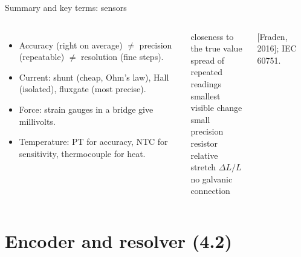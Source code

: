 \documentclass[aspectratio=169,10pt]{beamer}
\begin{document}
\begin{frame}{Summary and key terms: sensors}
\begin{columns}[T]
\begin{itemize}\small
\item Accuracy (right on average) $\neq$ precision (repeatable) $\neq$ resolution (fine steps).
\item Current: shunt (cheap, Ohm's law), Hall (isolated), fluxgate (most precise).
\item Force: strain gauges in a bridge give millivolts.
\item Temperature: PT for accuracy, NTC for sensitivity, thermocouple for heat.
\end{itemize}
\begin{defbox}
\small
{} closeness to the true value\\
 spread of repeated readings\\
 smallest visible change\\
 small precision resistor\\
 relative stretch $\Delta L/L$\\
 no galvanic connection
\end{defbox}
{\scriptsize\color{mkGray} [Fraden, 2016]; IEC 60751.}
\end{columns}
\end{frame}

\section{Encoder and resolver (4.2)}
\end{document}
